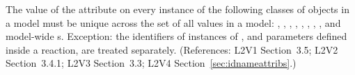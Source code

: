 The value of the  attribute on every instance of the
following classes of objects in a model must be unique
across the set of all  values in a model: \Model,
\FunctionDefinition, 
\Compartment, \Species, \Reaction, \SpeciesReference,
\ModifierSpeciesReference, \Event, and model-wide \Parameter{}s.
Exception: the identifiers of instances of \UnitDefinition, and parameters defined
inside a reaction, are treated separately.  (References: L2V1
Section~3.5; L2V2 Section~3.4.1; L2V3 Section~3.3; L2V4 
Section~\ref{sec:idnameattribs}.)

